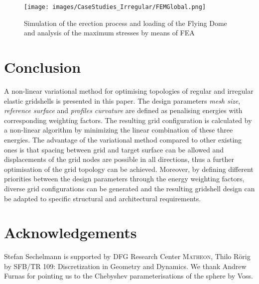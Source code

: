 \documentclass[Thesis.tex]{subfiles}
\begin{document}
\begin{figure}
\centering
\texttt{[image: images/CaseStudies\_Irregular/FEMGlobal.png]}
\caption{Simulation of the erection process and loading of the Flying Dome and analysis of the maximum stresses by means of FEA}
\label{fig:FEMGlobal}
\end{figure}


\section{Conclusion}

A non-linear variational method for optimising topologies of regular and irregular elastic gridshells is presented in this paper. The design parameters {\it mesh size}, {\it reference surface} and {\it profiles curvature} are defined as penalising energies with corresponding weighting factors. The resulting grid configuration is calculated by a non-linear algorithm by minimizing the linear combination of these three energies. The advantage of the variational method compared to other existing ones is that spacing between grid and target surface can be allowed and displacements of the grid nodes are possible in all directions, thus a further optimisation of the grid topology can be achieved. Moreover, by defining different priorities between the design parameters through the energy weighting factors, diverse grid configurations can be generated and the resulting gridshell design can be adapted to specific structural and architectural requirements. 

\section*{Acknowledgements}
Stefan Sechelmann is supported by DFG Research Center \textsc{Matheon}, Thilo R\"orig by SFB/TR 109: Discretization in Geometry and Dynamics.
We thank Andrew Furnas for pointing us to the Chebyshev parameterisations of the sphere by Voss. 

\subfilebibliography
\end{document}
